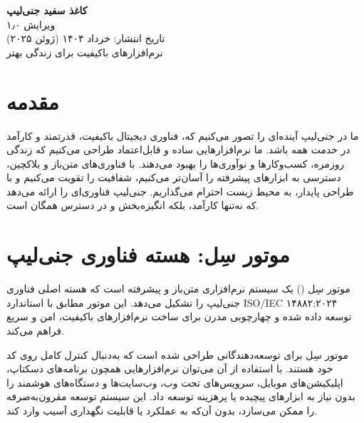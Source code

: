 \documentclass[a4paper,12pt,openany]{book}
\begin{document}
\begin{titlepage}
    \begin{center}
        \vspace*{1.5cm}
        {\Huge \textbf{کاغذ سفید جنی‌لیپ}} \\
        \vspace{0.5cm}
        {\Large ویرایش ۱٫۰} \\
        \vspace{0.5cm}
        {\large تاریخ انتشار: خرداد ۱۴۰۴ (ژوئن ۲۰۲۵)} \\
        \vspace{1.5cm}
        {\large نرم‌افزارهای باکیفیت برای زندگی بهتر} \\
    \end{center}
    \vfill
\end{titlepage}

\chapter{مقدمه}
ما در جنی‌لیپ آینده‌ای را تصور می‌کنیم که، فناوری دیجیتال باکیفیت، قدرتمند و کارآمد در خدمت همه باشد. ما نرم‌افزارهایی ساده و قابل‌اعتماد طراحی می‌کنیم که زندگی روزمره، کسب‌وکارها و نوآوری‌ها را بهبود می‌دهند. با فناوری‌های متن‌باز و بلاکچین، دسترسی به ابزارهای پیشرفته را آسان‌تر می‌کنیم، شفافیت را تقویت می‌کنیم و با طراحی پایدار، به محیط زیست احترام می‌گذاریم. جنی‌لیپ فناوری‌ای را ارائه می‌دهد که نه‌تنها کارآمد، بلکه انگیزه‌بخش و در دسترس همگان است.

\chapter{موتور سِل: هسته فناوری جنی‌لیپ}
موتور سِل () یک سیستم نرم‌افزاری متن‌باز و پیشرفته است که هسته اصلی فناوری جنی‌لیپ را تشکیل می‌دهد. این موتور مطابق با استاندارد  ISO/IEC ۱۴۸۸۲:۲۰۲۴ توسعه داده شده و چهارچوبی مدرن برای ساخت نرم‌افزارهای باکیفیت، امن و سریع فراهم می‌کند.

موتور سِل برای توسعه‌دهندگانی طراحی شده است که به‌دنبال کنترل کامل روی کد خود هستند. با استفاده از آن می‌توان نرم‌افزارهایی همچون برنامه‌های دسکتاپ، اپلیکیشن‌های موبایل، سرویس‌های تحت وب، وب‌سایت‌ها و دستگاه‌های هوشمند  را بدون نیاز به ابزارهای پیچیده یا پرهزینه توسعه داد. این سیستم توسعه مقرون‌به‌صرفه را ممکن می‌سازد، بدون آن‌که به عملکرد یا قابلیت نگهداری آسیب وارد کند.
\end{document}
